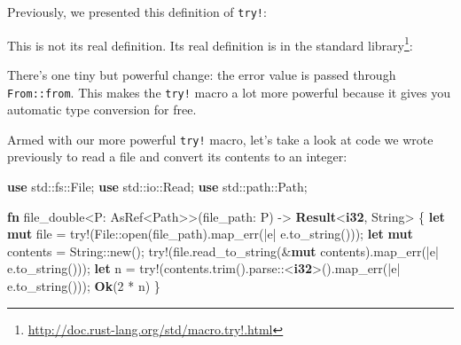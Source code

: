 \documentclass[a4paper,]{book}
\newenvironment{Shaded}{\begin{snugshade}}{\end{snugshade}}
\newcommand{\KeywordTok}[1]{\textcolor[rgb]{0.13,0.29,0.53}{\textbf{{#1}}}}
\newcommand{\DecValTok}[1]{\textcolor[rgb]{0.00,0.00,0.81}{{#1}}}
\newcommand{\OtherTok}[1]{\textcolor[rgb]{0.56,0.35,0.01}{{#1}}}
\newcommand{\NormalTok}[1]{{#1}}
\renewcommand{\href}[2]{#2\footnote{\url{#1}}}
\begin{document}
Previously, we presented this definition of \texttt{try!}:

\begin{Shaded}
\end{Shaded}

This is not its real definition. Its real definition is
\href{http://doc.rust-lang.org/std/macro.try!.html}{in the standard
library}:


\begin{Shaded}
\end{Shaded}

There's one tiny but powerful change: the error value is passed through
\texttt{From::from}. This makes the \texttt{try!} macro a lot more
powerful because it gives you automatic type conversion for free.

Armed with our more powerful \texttt{try!} macro, let's take a look at
code we wrote previously to read a file and convert its contents to an
integer:

\begin{Shaded}
\begin{Highlighting}[]
\KeywordTok{use} \NormalTok{std::fs::File;}
\KeywordTok{use} \NormalTok{std::io::Read;}
\KeywordTok{use} \NormalTok{std::path::Path;}

\KeywordTok{fn} \NormalTok{file_double<P: AsRef<Path>>(file_path: P) -> }\KeywordTok{Result}\NormalTok{<}\KeywordTok{i32}\NormalTok{, String> \{}
    \KeywordTok{let} \KeywordTok{mut} \NormalTok{file = }\OtherTok{try!}\NormalTok{(File::open(file_path).map_err(|e| e.to_string()));}
    \KeywordTok{let} \KeywordTok{mut} \NormalTok{contents = String::new();}
    \OtherTok{try!}\NormalTok{(file.read_to_string(&}\KeywordTok{mut} \NormalTok{contents).map_err(|e| e.to_string()));}
    \KeywordTok{let} \NormalTok{n = }\OtherTok{try!}\NormalTok{(contents.trim().parse::<}\KeywordTok{i32}\NormalTok{>().map_err(|e| e.to_string()));}
    \KeywordTok{Ok}\NormalTok{(}\DecValTok{2} \NormalTok{* n)}
\NormalTok{\}}
\end{Highlighting}
\end{Shaded}
\end{document}
